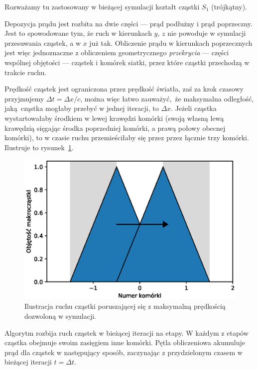 Rozważamy tu zastosowany w bieżącej symulacji kształt cząstki $S_1$ (trójkątny).

Depozycja prądu jest rozbita na dwie części --- prąd podłużny i prąd
poprzeczny. Jest to spowodowane tym, że ruch w kierunkach $y$, $z$ nie
powoduje w symulacji przesuwania cząstek, a w $x$ już tak. Obliczenie prądu
w kierunkach poprzecznych jest więc jednoznaczne z obliczeniem geometrycznego
\emph{przekrycia} --- części wspólnej objętości --- cząstek i komórek siatki,
przez które cząstki przechodzą w trakcie ruchu.

Prędkość cząstek jest ograniczona przez prędkość światła, zaś za krok czasowy
przyjmujemy $\Delta t = \Delta x/c$, można więc łatwo zauważyć, że maksymalna
odległość, jaką cząstka mogłaby przebyć w jednej iteracji, to $\Delta x$.
Jeżeli cząstka wystartowałaby środkiem w lewej krawędzi komórki (swoją
własną lewą krawędzią sięgając środka poprzedniej komórki, a prawą połowy
obecnej komórki), to w czasie ruchu przemieściłaby się przez
przez łącznie trzy komórki. Ilustruje to rysunek~\ref{fig:deposition-movement}.

\begin{figure}[h!]
  \includegraphics[width=\textwidth]{Images/deposition-movement}
  \caption{Ilustracja ruchu cząstki poruszającej się z maksymalną prędkością dozwoloną w symulacji.\label{fig:deposition-movement}}
\end{figure}

Algorytm rozbija ruch cząstek w bieżącej iteracji na etapy. W każdym z
etapów cząstka obejmuje swoim zasięgiem inne komórki. Pętla obliczeniowa
akumuluje prąd dla cząstek w następujący sposób, zaczynając z przydzielonym
czasem w bieżącej iteracji $t = \Delta t$.

